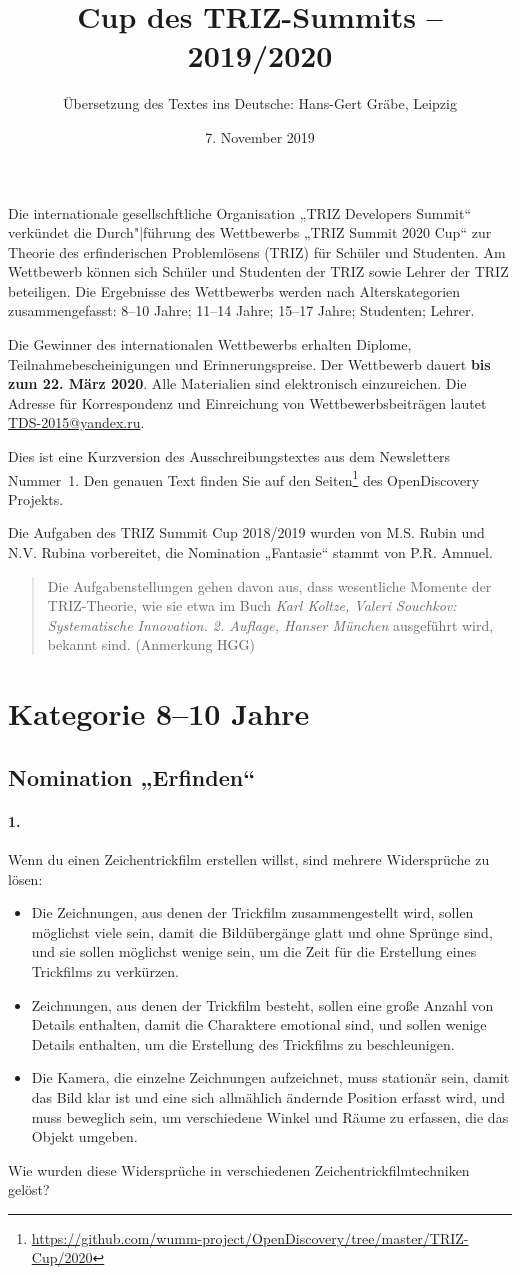 \documentclass[11pt,a4paper]{article}
\title{Cup des TRIZ-Summits – 2019/2020}
\author{Übersetzung des Textes ins Deutsche: Hans-Gert Gr\"abe, Leipzig}
\date{7. November 2019}
\newcommand{\contradictions}{
Wenn du einen Zeichentrickfilm erstellen willst, sind mehrere Widersprüche zu
lösen:
\begin {itemize}
\item Die Zeichnungen, aus denen der Trickfilm zusammengestellt wird, sollen
  möglichst viele sein, damit die Bildübergänge glatt und ohne Sprünge sind,
  und sie sollen möglichst wenige sein, um die Zeit für die Erstellung eines
  Trickfilms zu verkürzen.
\item Zeichnungen, aus denen der Trickfilm besteht, sollen eine große Anzahl
  von Details enthalten, damit die Charaktere emotional sind, und sollen
  wenige Details enthalten, um die Erstellung des Trickfilms zu beschleunigen.
\item Die Kamera, die einzelne Zeichnungen aufzeichnet, muss stationär sein,
  damit das Bild klar ist und eine sich allmählich ändernde Position erfasst
  wird, und muss beweglich sein, um verschiedene Winkel und Räume zu erfassen,
  die das Objekt umgeben.
\end{itemize}
Wie wurden diese Widersprüche in verschiedenen Zeichentrickfilmtechniken
gelöst?
}
\begin{document}
\maketitle

Die internationale gesellschftliche Organisation „TRIZ Developers Summit“
verkündet die Durch"|führung des Wettbewerbs „TRIZ Summit 2020 Cup“ zur
Theorie des erfinderischen Problemlösens (TRIZ) für Schüler und Studenten. Am
Wettbewerb können sich Schüler und Studenten der TRIZ sowie Lehrer der TRIZ
beteiligen.  Die Ergebnisse des Wettbewerbs werden nach Alterskategorien
zusammengefasst: 8--10 Jahre; 11--14 Jahre; 15--17 Jahre; Studenten; Lehrer.

Die Gewinner des internationalen Wettbewerbs erhalten Diplome,
Teilnahmebescheinigungen und Erinnerungspreise. Der Wettbewerb dauert
\textbf{bis zum 22. März 2020}. Alle Materialien sind elektronisch
einzureichen. Die Adresse für Korrespondenz und Einreichung von
Wettbewerbsbeiträgen lautet \url{TDS-2015@yandex.ru}.

Dies ist eine Kurzversion des Ausschreibungstextes aus dem Newsletters
Nummer~1. Den genauen Text finden Sie auf den
Seiten\footnote{\url{https://github.com/wumm-project/OpenDiscovery/tree/master/TRIZ-Cup/2020}}
des OpenDiscovery Projekts.

Die Aufgaben des TRIZ Summit Cup 2018/2019 wurden von M.S. Rubin und
N.V. Rubina vorbereitet, die Nomination „Fantasie“ stammt von P.R. Amnuel.

\begin{quote}
  Die Aufgabenstellungen gehen davon aus, dass wesentliche Momente der
  TRIZ-Theorie, wie sie etwa im Buch \emph{Karl Koltze, Valeri Souchkov:
    Systematische Innovation. 2. Auflage, Hanser München} ausgeführt wird,
  bekannt sind.  (Anmerkung HGG)
\end{quote}

\vfill
\tableofcontents
\vfill
\clearpage
\section{Kategorie 8--10 Jahre}

\subsection*{Nomination „Erfinden“}

\paragraph{1.}
\contradictions
\end{document}

